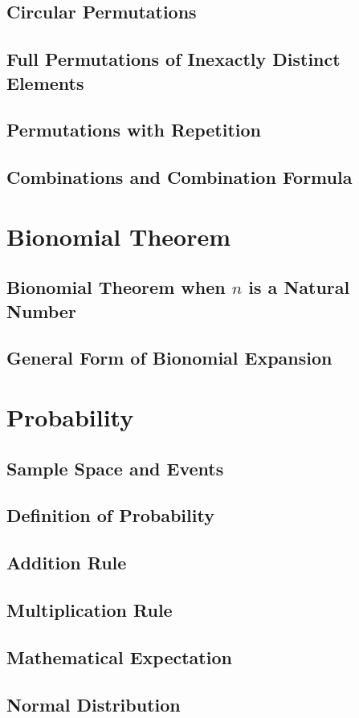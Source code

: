 \documentclass{report}
\begin{document}
\begin{multicols}{2}
  \section{Circular Permutations}

  \section{Full Permutations of Inexactly Distinct Elements}

  \section{Permutations with Repetition}

  \section{Combinations and Combination Formula}

  \chapter{Bionomial Theorem}

  \section{Bionomial Theorem when $n$ is a Natural Number}

  \section{General Form of Bionomial Expansion}

  \chapter{Probability}

  \section{Sample Space and Events}

  \section{Definition of Probability}

  \section{Addition Rule}

  \section{Multiplication Rule}

  \section{Mathematical Expectation}

  \section{Normal Distribution}
\end{multicols}
\end{document}
